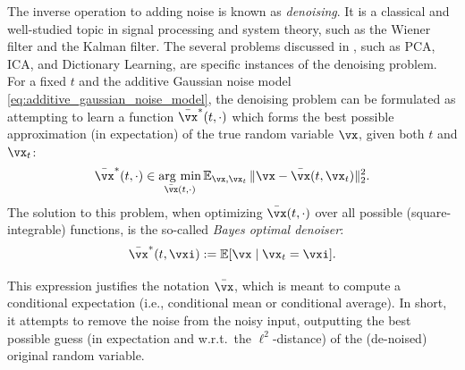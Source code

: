 \documentclass[../../book-main.tex]{subfiles}
\begin{document}
The inverse operation to adding noise is known as \textit{denoising}. It is a classical and well-studied topic in signal processing and system theory, such as the Wiener filter and the Kalman filter. The several problems discussed in , such as PCA, ICA, and Dictionary Learning, are specific instances of the denoising problem. For a fixed \(t\) and the additive Gaussian noise model \eqref{eq:additive_gaussian_noise_model}, the denoising problem can be formulated as attempting to learn a function \(\bar{\vx}^{\ast}(t, \cdot)\) which forms the best possible approximation (in expectation) of the true random variable \(\vx\), given both \(t\) and \(\vx_{t}\):
\begin{equation}\label{eq:denoising_loss}
	\bar{\vx}^{\ast}(t, \cdot) \in \argmin_{\bar{\vx}(t, \cdot)}\Ex_{\vx, \vx_{t}}\norm{\vx - \bar{\vx}(t, \vx_{t})}_{2}^{2}.
\end{equation}
The solution to this problem, when optimizing \(\bar{\vx}(t, \cdot)\) over all possible (square-integrable) functions, is the so-called \textit{Bayes optimal denoiser}: 
\begin{equation}\label{eq:optimal_denoiser}
	\bar{\vx}^{\ast}(t, \vxi) := \Ex[\vx \mid \vx_{t} = \vxi].
\end{equation}

This expression justifies the notation \(\bar{\vx}\), which is meant to compute a conditional expectation (i.e., conditional mean or conditional average). In short, it attempts to remove the noise from the noisy input, outputting the best possible guess (in expectation and w.r.t.~the \(\ell^{2}\)-distance) of the (de-noised) original random variable.
\end{document}
